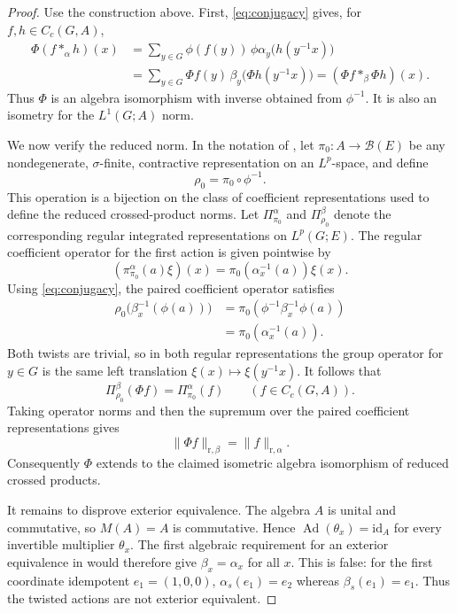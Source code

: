 \documentclass[11pt]{article}
\newcommand{\id}{\mathrm{id}}
\newcommand{\Ad}{\operatorname{Ad}}
\begin{document}
\begin{proof}
Use the construction above.  First, \eqref{eq:conjugacy} gives, for
$f,h\in C_c(G,A)$,
\begin{align*}
 \Phi(f*_{\alpha}h)(x)
 &=\sum_{y\in G}\phi(f(y))\,
   \phi\alpha_y\bigl(h(y^{-1}x)\bigr)\\
 &=\sum_{y\in G}\Phi f(y)\,
   \beta_y\bigl(\Phi h(y^{-1}x)\bigr)
  =(\Phi f*_{\beta}\Phi h)(x).
\end{align*}
Thus $\Phi$ is an algebra isomorphism with inverse obtained from $\phi^{-1}$.
It is also an isometry for the $L^1(G;A)$ norm.

We now verify the reduced norm.  In the notation of \cite{DFP}, let
$\pi_0:A\to\mathcal B(E)$ be any nondegenerate, $\sigma$-finite, contractive
representation on an $L^p$-space, and define
\[
 \rho_0=\pi_0\circ\phi^{-1}.
\]
This operation is a bijection on the class of coefficient representations used
to define the reduced crossed-product norms.  Let
$\Pi^{\alpha}_{\pi_0}$ and $\Pi^{\beta}_{\rho_0}$ denote the corresponding
regular integrated representations on $L^p(G;E)$.  The regular coefficient
operator for the first action is given pointwise by
\[
 (\pi^{\alpha}_{\pi_0}(a)\xi)(x)
 =\pi_0(\alpha_x^{-1}(a))\xi(x).
\]
Using \eqref{eq:conjugacy}, the paired coefficient operator satisfies
\begin{align*}
 \rho_0\bigl(\beta_x^{-1}(\phi(a))\bigr)
 &=\pi_0\!\left(\phi^{-1}\beta_x^{-1}\phi(a)\right)\\
 &=\pi_0(\alpha_x^{-1}(a)).
\end{align*}
Both twists are trivial, so in both regular representations the group operator
for $y\in G$ is the same left translation
$\xi(x)\mapsto\xi(y^{-1}x)$.  It follows that
\begin{equation}\label{eq:integrated}
 \Pi^{\beta}_{\rho_0}(\Phi f)
 =\Pi^{\alpha}_{\pi_0}(f)
 \qquad(f\in C_c(G,A)).
\end{equation}
Taking operator norms and then the supremum over the paired coefficient
representations gives
\[
 \|\Phi f\|_{\mathrm r,\beta}=\|f\|_{\mathrm r,\alpha}.
\]
Consequently $\Phi$ extends to the claimed isometric algebra isomorphism of
reduced crossed products.

It remains to disprove exterior equivalence.  The algebra $A$ is unital and
commutative, so $M(A)=A$ is commutative.  Hence
$\Ad(\theta_x)=\id_A$ for every invertible multiplier $\theta_x$.  The first
algebraic requirement for an exterior equivalence in \cite{DFP} would therefore
give $\beta_x=\alpha_x$ for all $x$.  This is false: for the first coordinate
idempotent $e_1=(1,0,0)$, $\alpha_s(e_1)=e_2$ whereas
$\beta_s(e_1)=e_1$.  Thus the twisted actions are not exterior equivalent.
\end{proof}
\end{document}
